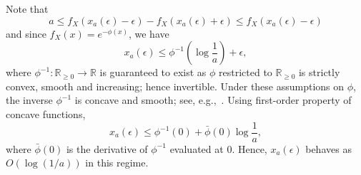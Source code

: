 \documentclass[10pt]{article} %
\theoremstyle{plain}
\theoremstyle{definition}
\theoremstyle{remark}
\newcommand{\bR}{\mathbb R}
\newcommand{\svcomment}[1]{\textcolor{red}{SV: #1}}
\newcommand{\rkcomment}[1]{\textcolor{blue}{RK: #1}}
\begin{document}
Note that
\[
a\leq f_X(x_a(\epsilon)-\epsilon) - f_X(x_a(\epsilon)+\epsilon) \leq f_X(x_a(\epsilon)-\epsilon)
\]
and since $f_X(x)=e^{-\phi(x)}$, we have
\[
x_a(\epsilon)\leq \phi^{-1}\left( \log\frac{1}{a} \right) +\epsilon,
\]
where $\phi^{-1}:\bR_{\geq 0}\to \bR$ is guaranteed to exist as $\phi$ restricted to $\bR_{\geq 0}$ is strictly convex, smooth and increasing; hence invertible. Under these assumptions on $\phi$, the inverse $\phi^{-1}$ is concave and smooth; see, e.g.,~\cite[Prop.~1.1.7]{niculescu2006convex}. %
Using first-order property of concave functions,
\begin{equation}\label{eq:xa_bound_loga}
x_a(\epsilon)\leq \phi^{-1}(0) + \bar{\phi}(0)\log\frac{1}{a},
\end{equation}
where $\bar{\phi}(0)$ is the derivative of $\phi^{-1}$ evaluated at $0$. Hence, $x_a(\epsilon)$ behaves as $O(\log(1/a))$ in this regime.
\end{document}
